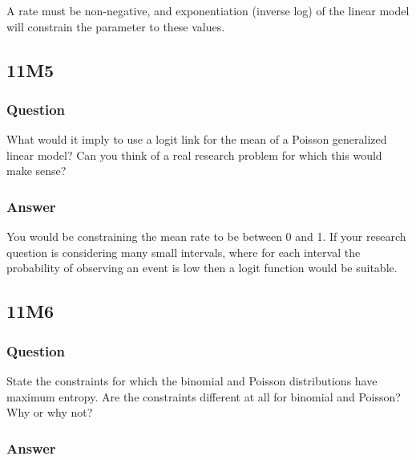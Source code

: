 \documentclass[
]{book}
\begin{document}
A rate must be non-negative, and exponentiation (inverse log) of the linear model will constrain the parameter to these values.

\hypertarget{m5-4}{%
\subsection*{11M5}\label{m5-4}}

\hypertarget{question-89}{%
\subsubsection*{Question}\label{question-89}}

What would it imply to use a logit link for the mean of a Poisson generalized linear model? Can you think of a real research problem for which this would make sense?

\hypertarget{answer-89}{%
\subsubsection*{Answer}\label{answer-89}}

You would be constraining the mean rate to be between 0 and 1. If your research question is considering many small intervals, where for each interval the probability of observing an event is low then a logit function would be suitable.

\hypertarget{m6-4}{%
\subsection*{11M6}\label{m6-4}}

\hypertarget{question-90}{%
\subsubsection*{Question}\label{question-90}}

State the constraints for which the binomial and Poisson distributions have maximum entropy. Are the constraints different at all for binomial and Poisson? Why or why not?

\hypertarget{answer-90}{%
\subsubsection*{Answer}\label{answer-90}}
\end{document}
